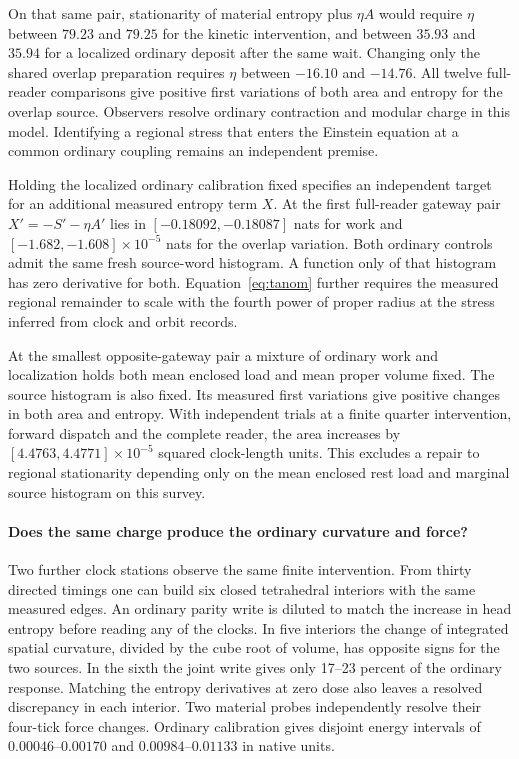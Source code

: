 \documentclass[11pt]{article}
\begin{document}
On that same pair, stationarity of material entropy plus $\eta A$ would
require $\eta$ between $79.23$ and $79.25$ for the kinetic intervention,
and between $35.93$ and $35.94$ for a localized ordinary deposit after
the same wait. Changing only the shared overlap preparation requires
$\eta$ between $-16.10$ and $-14.76$. All twelve full-reader comparisons
give positive first variations of both area and entropy for the overlap
source. Observers resolve ordinary contraction and modular charge in this
model. Identifying a regional stress that enters the Einstein equation
at a common ordinary coupling remains an independent premise.

Holding the localized ordinary calibration fixed specifies an independent
target for an additional measured entropy term $X$. At the first
full-reader gateway pair $X'=-S'-\eta A'$ lies in
$[-0.18092,-0.18087]$ nats for work and
$[-1.682,-1.608]\times10^{-5}$ nats for the overlap variation.
Both ordinary controls admit the same fresh source-word histogram.
A function only of that histogram has zero derivative for both.
Equation~\eqref{eq:tanom} further requires the measured regional
remainder to scale with the fourth power of proper radius at the
stress inferred from clock and orbit records.

At the smallest opposite-gateway pair a mixture of ordinary work and
localization holds both mean enclosed load and mean proper volume fixed.
The source histogram is also fixed. Its measured first variations give
positive changes in both area and entropy. With independent trials at a
finite quarter intervention, forward dispatch and the complete reader,
the area increases by $[4.4763,4.4771]\times10^{-5}$ squared clock-length
units. This excludes a repair to regional stationarity depending only
on the mean enclosed rest load and marginal source histogram on this survey.

\paragraph{Does the same charge produce the ordinary curvature and force?}
Two further clock stations observe the same finite intervention. From
thirty directed timings one can build six closed tetrahedral interiors
with the same measured edges. An ordinary parity write is diluted to
match the increase in head entropy before reading any of the clocks.
In five interiors the change of integrated spatial curvature, divided
by the cube root of volume, has opposite signs for the two sources.
In the sixth the joint write gives only 17--23 percent of the ordinary
response. Matching the entropy derivatives at zero dose also leaves
a resolved discrepancy in each interior. Two material probes
independently resolve their four-tick force changes. Ordinary
calibration gives disjoint energy intervals of
\(0.00046\)--\(0.00170\) and \(0.00984\)--\(0.01133\) in native units.
\end{document}
